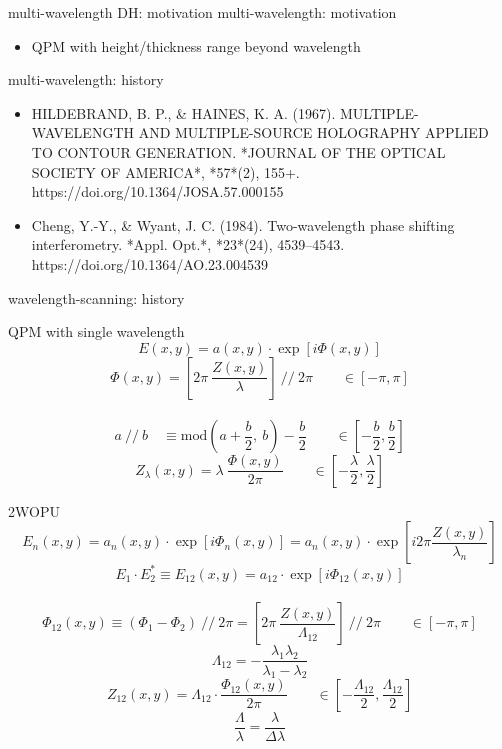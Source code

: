 \documentclass[t, aspectratio=169]{beamer}
\begin{document}
\begin{frame}{multi-wavelength DH: motivation}
multi-wavelength: motivation
	\begin{itemize}
		\item QPM with height/thickness range beyond wavelength
	\end{itemize}	
multi-wavelength: history
	\begin{itemize}
		\item HILDEBRAND, B. P., \& HAINES, K. A. (1967). MULTIPLE-WAVELENGTH AND MULTIPLE-SOURCE HOLOGRAPHY APPLIED TO CONTOUR GENERATION. *JOURNAL OF THE OPTICAL SOCIETY OF AMERICA*, *57*(2), 155+. https://doi.org/10.1364/JOSA.57.000155
		\item Cheng, Y.-Y., \& Wyant, J. C. (1984). Two-wavelength phase shifting interferometry. *Appl. Opt.*, *23*(24), 4539–4543. https://doi.org/10.1364/AO.23.004539
	\end{itemize}
wavelength-scanning: history
\end{frame}


\begin{frame}{QPM with single wavelength}
\[ E(x,y) = a(x,y)\cdot\exp[i\Phi(x,y)] \]
\pause
\[ \Phi(x,y) = \left[ 2\pi\ \frac{Z(x,y)}{\lambda} \right] \ //\ 2\pi \qquad \in [-\pi,\pi] \] \\
\[ a \ //\ b \quad \equiv \textrm{mod}\left(a+\frac{b}{2},\ b\right)-\frac{b}{2} \qquad \in \left[-\frac{b}{2}, \frac{b}{2}\right] \]
\pause
\[ Z_\lambda(x,y) = \lambda\ \frac{\Phi(x,y)}{2\pi} \qquad \in \left[-\frac{\lambda}{2}, \frac{\lambda}{2}\right] \]
\end{frame}


\begin{frame}{2WOPU}
\vspace{-5 mm}
\[ E_n(x,y) = a_n(x,y)\cdot\exp[i\Phi_n(x,y)] = a_n(x,y)\cdot\exp\left[ i2\pi\frac{Z(x,y)}{\lambda_n} \right] \]
\pause
\[ E_1\cdot E_2^* \equiv E_{12}(x,y) = a_{12}\cdot\exp[i\Phi_{12}(x,y)] \] \\
\[ \Phi_{12}(x,y) \equiv (\Phi_1 - \Phi_2) \ //\ 2\pi = \left[ 2\pi\ \frac{Z(x,y)}{\Lambda_{12}} \right]\ //\ 2\pi \qquad \in [-\pi,\pi] \]
\[ \Lambda_{12} = -\frac{\lambda_1 \lambda_2}{\lambda_1 - \lambda_2} \]
\pause
\[ Z_{12}(x,y) = \Lambda_{12}\cdot\frac{\Phi_{12}(x,y)}{2\pi} \qquad \in\left[-\frac{\Lambda_{12}}{2}, \frac{\Lambda_{12}}{2} \right] \]
\pause
\[ \frac{\Lambda}{\lambda} = \frac{\lambda}{\Delta\lambda} \]
\end{frame}
\end{document}
